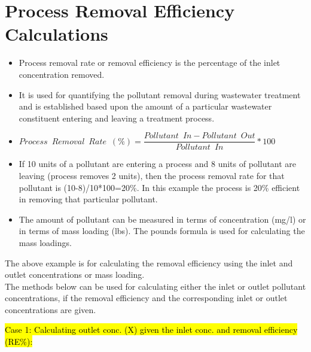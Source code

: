 \section{Process Removal Efficiency Calculations}

\begin{itemize}
\item Process removal rate or removal efficiency is the percentage of the inlet concentration removed.  
\item It is used for quantifying the pollutant removal during wastewater treatment and is established based upon the amount of a particular wastewater constituent entering and leaving a treatment process.

\item $Process \enspace Removal \enspace Rate \enspace (\%) = \dfrac{Pollutant \enspace  In-Pollutant\enspace  Out}{Pollutant \enspace In}*100$\\

\item If 10 units of a pollutant are entering a process and 8 units of pollutant are leaving (process removes 2 units), then the process removal rate for that pollutant is (10-8)/10*100=20\%.  In this example the process is 20\% efficient in removing that particular pollutant.

\item The amount of pollutant can be measured in terms of concentration (mg/l) or in terms of mass loading (lbs).  The pounds formula is used for calculating the mass loadings.  
\end{itemize}
The above example is for calculating the removal efficiency using the inlet and outlet concentrations or mass loading.\\
The methods below can be used for calculating either the inlet or outlet pollutant concentrations, if the removal efficiency and the corresponding inlet or outlet concentrations are given. 


\hl{Case 1:  Calculating outlet conc. (X) given the inlet conc. and removal efficiency (RE\%):}

